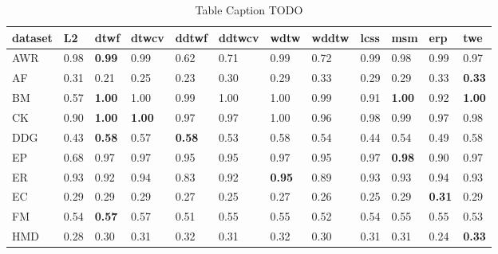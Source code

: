 \begin{table}
\centering
\caption{Table Caption TODO}
\label{tbl:table1}
\begin{tabular}{l*{11}{p{0.5cm}}}
\toprule
dataset &            L2 &          dtwf &         dtwcv &         ddtwf &        ddtwcv &          wdtw &         wddtw &          lcss &           msm &           erp &           twe \\
\midrule
    AWR &          0.98 & \textbf{0.99} &          0.99 &          0.62 &          0.71 &          0.99 &          0.72 &          0.99 &          0.98 &          0.99 &          0.97 \\
     AF &          0.31 &          0.21 &          0.25 &          0.23 &          0.30 &          0.29 &          0.33 &          0.29 &          0.29 &          0.33 & \textbf{0.33} \\
     BM &          0.57 & \textbf{1.00} &          1.00 &          0.99 &          1.00 &          1.00 &          0.99 &          0.91 & \textbf{1.00} &          0.92 & \textbf{1.00} \\
     CK &          0.90 & \textbf{1.00} & \textbf{1.00} &          0.97 &          0.97 &          1.00 &          0.96 &          0.98 &          0.99 &          0.97 &          0.98 \\
    DDG &          0.43 & \textbf{0.58} &          0.57 & \textbf{0.58} &          0.53 &          0.58 &          0.54 &          0.44 &          0.54 &          0.49 &          0.58 \\
     EP &          0.68 &          0.97 &          0.97 &          0.95 &          0.95 &          0.97 &          0.95 &          0.97 & \textbf{0.98} &          0.90 &          0.97 \\
     ER &          0.93 &          0.92 &          0.94 &          0.83 &          0.92 & \textbf{0.95} &          0.89 &          0.93 &          0.93 &          0.94 &          0.93 \\
     EC &          0.29 &          0.29 &          0.29 &          0.27 &          0.25 &          0.27 &          0.26 &          0.25 &          0.29 & \textbf{0.31} &          0.29 \\
     FM &          0.54 & \textbf{0.57} &          0.57 &          0.51 &          0.55 &          0.55 &          0.52 &          0.54 &          0.55 &          0.55 &          0.53 \\
    HMD &          0.28 &          0.30 &          0.31 &          0.32 &          0.31 &          0.32 &          0.30 &          0.31 &          0.31 &          0.24 & \textbf{0.33} \\

\end{tabular}
\end{table}
